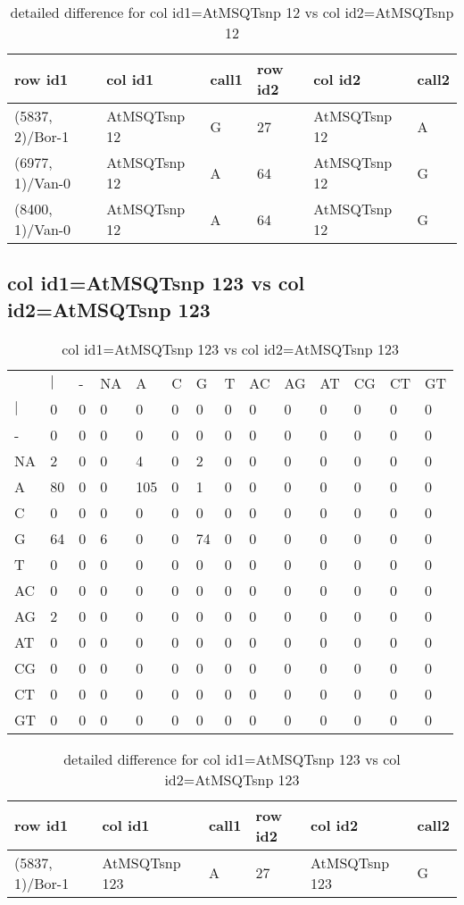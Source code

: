 \begin{center}
\begin{longtable}{|l|l|l|l|l|l|}
\caption{detailed difference for col id1=AtMSQTsnp 12 vs col id2=AtMSQTsnp 12} \label{table_dm699}\\
\hline
row id1&col id1&call1&row id2&col id2&call2\\
\hline
(5837, 2)/Bor-1&AtMSQTsnp 12&G&27&AtMSQTsnp 12&A\\
(6977, 1)/Van-0&AtMSQTsnp 12&A&64&AtMSQTsnp 12&G\\
(8400, 1)/Van-0&AtMSQTsnp 12&A&64&AtMSQTsnp 12&G\\
\hline
\end{longtable}
\end{center}

\subsection{col id1=AtMSQTsnp 123 vs col id2=AtMSQTsnp 123}
\begin{center}
\begin{longtable}{|l|l|l|l|l|l|l|l|l|l|l|l|l|l|}
\caption{col id1=AtMSQTsnp 123 vs col id2=AtMSQTsnp 123} \label{table_dm700}\\
\hline
\\
\hline
&$|$&-&NA&A&C&G&T&AC&AG&AT&CG&CT&GT\\
$|$&0&0&0&0&0&0&0&0&0&0&0&0&0\\
-&0&0&0&0&0&0&0&0&0&0&0&0&0\\
NA&2&0&0&4&0&2&0&0&0&0&0&0&0\\
A&80&0&0&105&0&1&0&0&0&0&0&0&0\\
C&0&0&0&0&0&0&0&0&0&0&0&0&0\\
G&64&0&6&0&0&74&0&0&0&0&0&0&0\\
T&0&0&0&0&0&0&0&0&0&0&0&0&0\\
AC&0&0&0&0&0&0&0&0&0&0&0&0&0\\
AG&2&0&0&0&0&0&0&0&0&0&0&0&0\\
AT&0&0&0&0&0&0&0&0&0&0&0&0&0\\
CG&0&0&0&0&0&0&0&0&0&0&0&0&0\\
CT&0&0&0&0&0&0&0&0&0&0&0&0&0\\
GT&0&0&0&0&0&0&0&0&0&0&0&0&0\\
\hline
\end{longtable}
\end{center}

\begin{center}
\begin{longtable}{|l|l|l|l|l|l|}
\caption{detailed difference for col id1=AtMSQTsnp 123 vs col id2=AtMSQTsnp 123} \label{table_dm701}\\
\hline
row id1&col id1&call1&row id2&col id2&call2\\
\hline
(5837, 1)/Bor-1&AtMSQTsnp 123&A&27&AtMSQTsnp 123&G\\
\hline
\end{longtable}
\end{center}


